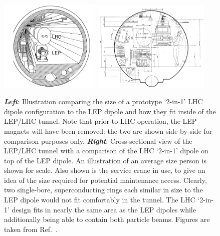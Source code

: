 \begin{figure}[!htb]
    \begin{center}
        \includegraphics[width=0.43\textwidth]{figures/chapter2/lhc_lep_dipole_comp}
        \includegraphics[width=0.50\textwidth]{figures/chapter2/lhc_lep_dipole_comp_person}
        \caption{
            \textbf{\textit{Left}}: Illustration comparing the size of a prototype `2-in-1' LHC dipole configuration to the
                LEP dipole and how they fit inside of the LEP/LHC tunnel. Note that prior to LHC operation,
                the LEP magnets will have been removed: the two are shown side-by-side for comparison purposes only.
            \textbf{\textit{Right}}: Cross-sectional view of the LEP/LHC tunnel with a comparison of the LHC `2-in-1' dipole
                on top of the LEP dipole. An illustration of an average size person is shown
                for scale. Also shown is the service crane in use, to give an idea of the size required
                for potential maintenance access. Clearly, two single-bore, superconducting rings each similar in size
                to the LEP dipole would not fit comfortably in the tunnel. The LHC `2-in-1' design fits
                in nearly the same area as the LEP dipoles while additionally being able to contain both
                particle beams.
                Figures are taken from Ref.~\cite{ECFALHCinLEP}.
        }
        \label{fig:lhc_lep_dipole_comp}
    \end{center}
\end{figure}

